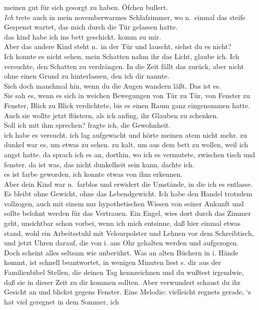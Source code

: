 \documentclass[
]{article}
\begin{document}
meinen gut für sich gesorgt zu haben. Öfchen bullert.\\
\emph{Ich} trete auch in mein novemberwarmes Schlafzimmer, wo n.~einmal
das steife Gespenst wartet, das mich durch die Tür gelassen hatte.\\
das kind habe ich ins bett geschickt. komm zu mir.\\
Aber das andere Kind steht n.~in der Tür und lauscht, siehst du es
nicht?\\
Ich konnte es nicht sehen, mein Schatten nahm ihr das Licht, glaube ich.
Ich versuchte, den Schatten zu verdrängen. In die Zeit fällt das zurück,
aber nicht ohne einen Grund zu hinterlassen, den ich dir nannte.\\
Sieh doch manchmal hin, wenn du die Augen wandern läßt. Das ist es.\\
Sie sah es, wenn es sich in weichen Bewegungen von Tür zu Tür, von
Fenster zu Fenster, Blick zu Blick verdichtete, bis es einen Raum ganz
eingenommen hatte. Auch sie wollte jetzt flüstern, als ich anfing, ihr
Glauben zu schenken.\\
Soll ich mit ihm sprechen? fragte ich, die Gewohnheit.\\
ich habe es versucht. ich lag aufgewacht und hörte meinen atem nicht
mehr. zu dunkel war es, um etwas zu sehen. zu kalt, um aus dem bett zu
wollen, weil ich angst hatte. da sprach ich es an, dorthin, wo ich es
vermutete, zwischen tisch und fenster. da ist was, das nicht dunkelheit
sein kann, dachte ich.\\
es ist farbe geworden, ich konnte etwas von ihm erkennen.\\
Aber dein Kind war n.~farblos und erwidert die Umstände, in die ich es
entlasse. Es bleibt ohne Gewicht, ohne das Lebendgewicht. Ich habe den
Handel trotzdem vollzogen, auch mit einem nur hypothetischen Wissen von
seiner Ankunft und sollte belohnt werden für das Vertrauen. Ein Engel,
wies dort durch das Zimmer geht, unsichtbar schon vorbei, wenn ich mich
entsinne, daß hier einmal etwas stand, wohl ein Arbeitsstuhl mit
Velourpolster und Lehnen vor dem Schreibtisch, und jetzt Uhren darauf,
die von i. ans Ohr gehalten werden und aufgezogen. Doch scheint alles
seltsam wie unberührt. Was an alten Büchern in i. Hände kommt, ist
schnell beantwortet, in wenigen Minuten liest s. dir aus der
Familienbibel Stellen, die deinen Tag kennzeichnen und du wußtest
irgendwie, daß sie in dieser Zeit zu dir kommen sollten. Aber verwundert
schaust du ihr Gesicht an und blickst gegens Fenster. Eine Melodie:
vielleicht regnets gerade, `s hat viel geregnet in dem Sommer, ich
\end{document}
